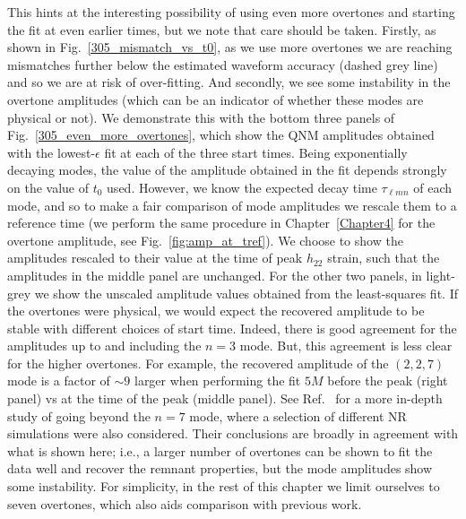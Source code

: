 This hints at the interesting possibility of using even more overtones and starting the fit at even earlier times, but we note that care should be taken.
Firstly, as shown in Fig.~\ref{305_mismatch_vs_t0}, as we use more overtones we are reaching mismatches further below the estimated waveform accuracy (dashed grey line) and so we are at risk of over-fitting.
And secondly, we see some instability in the overtone amplitudes (which can be an indicator of whether these modes are physical or not).
We demonstrate this with the bottom three panels of Fig.~\ref{305_even_more_overtones}, which show the QNM amplitudes obtained with the lowest-$\epsilon$ fit at each of the three start times.
Being exponentially decaying modes, the value of the amplitude obtained in the fit depends strongly on the value of $t_0$ used.
However, we know the expected decay time $\tau_{\ell m n}$ of each mode, and so to make a fair comparison of mode amplitudes we rescale them to a reference time (we perform the same procedure in Chapter~\ref{Chapter4} for the overtone amplitude, see Fig.~\ref{fig:amp_at_tref}).
We choose to show the amplitudes rescaled to their value at the time of peak $h_{22}$ strain, such that the amplitudes in the middle panel are unchanged.
For the other two panels, in light-grey we show the unscaled amplitude values obtained from the least-squares fit.
If the overtones were physical, we would expect the recovered amplitude to be stable with different choices of start time.
Indeed, there is good agreement for the amplitudes up to and including the $n=3$ mode.
But, this agreement is less clear for the higher overtones.
For example, the recovered amplitude of the $(2,2,7)$ mode is a factor of $\sim 9$ larger when performing the fit $5M$ before the peak (right panel) vs at the time of the peak (middle panel).
See Ref.~\cite{Forteza:2021wfq} for a more in-depth study of going beyond the $n=7$ mode, where a selection of different NR simulations were also considered.
Their conclusions are broadly in agreement with what is shown here; i.e., a larger number of overtones can be shown to fit the data well and recover the remnant properties, but the mode amplitudes show some instability.
For simplicity, in the rest of this chapter we limit ourselves to seven overtones, which also aids comparison with previous work.

